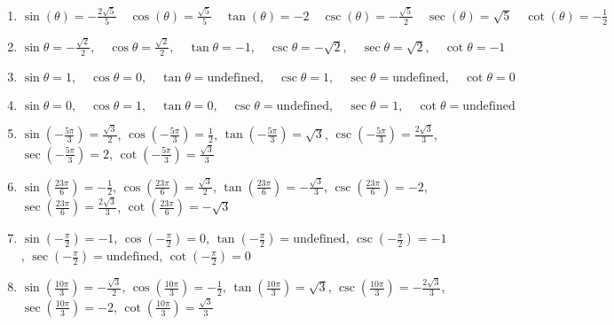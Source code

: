 \begin{enumerate}
    \item $\sin(\theta) = -\frac{2\sqrt{5}}{5} \quad  \cos(\theta) = \frac{\sqrt{5}}{5} \quad \tan(\theta) = -2 \quad \csc(\theta) = -\frac{\sqrt{5}}{2} \quad \sec(\theta) = \sqrt{5} \quad \cot(\theta) = -\frac{1}{2}$
     
    
    \item $\sin\theta = -\frac{\sqrt{2}}{2}, \quad \cos\theta = \frac{\sqrt{2}}{2}, \quad \tan\theta = -1, \quad \csc\theta = -\sqrt{2}, \quad \sec\theta = \sqrt{2}, \quad \cot\theta = -1$
    
    \item $\sin\theta = 1, \quad \cos\theta = 0, \quad \tan\theta = \text{undefined}, \quad \csc\theta = 1, \quad \sec\theta = \text{undefined}, \quad \cot\theta = 0$
    
    \item $\sin\theta = 0, \quad \cos\theta = 1, \quad \tan\theta = 0, \quad \csc\theta = \text{undefined}, \quad \sec\theta = 1, \quad \cot\theta = \text{undefined}$
    
    \item $\sin\left(-\frac{5\pi}{3}\right) = \frac{\sqrt{3}}{2}$, 
        $\cos\left(-\frac{5\pi}{3}\right) = \frac{1}{2}$, 
        $\tan\left(-\frac{5\pi}{3}\right) = \sqrt{3}$, 
        $\csc\left(-\frac{5\pi}{3}\right) = \frac{2\sqrt{3}}{3}$, 
        $\sec\left(-\frac{5\pi}{3}\right) = 2$, 
        $\cot\left(-\frac{5\pi}{3}\right) = \frac{\sqrt{3}}{3}$
        
    \item $\sin\left(\frac{23\pi}{6}\right) = -\frac{1}{2}$, 
        $\cos\left(\frac{23\pi}{6}\right) = \frac{\sqrt{3}}{2}$, 
        $\tan\left(\frac{23\pi}{6}\right) = -\frac{\sqrt{3}}{3}$, 
        $\csc\left(\frac{23\pi}{6}\right) = -2$, 
        $\sec\left(\frac{23\pi}{6}\right) = \frac{2\sqrt{3}}{3}$, 
        $\cot\left(\frac{23\pi}{6}\right) = -\sqrt{3}$
        
    \item $\sin\left(-\frac{\pi}{2}\right) = -1$, 
        $\cos\left(-\frac{\pi}{2}\right) = 0$, 
        $\tan\left(-\frac{\pi}{2}\right) = \text{undefined}$, 
        $\csc\left(-\frac{\pi}{2}\right) = -1$, 
        $\sec\left(-\frac{\pi}{2}\right) = \text{undefined}$, 
        $\cot\left(-\frac{\pi}{2}\right) = 0$
        
    \item $\sin\left(\frac{10\pi}{3}\right) = -\frac{\sqrt{3}}{2}$, 
        $\cos\left(\frac{10\pi}{3}\right) = -\frac{1}{2}$, 
        $\tan\left(\frac{10\pi}{3}\right) = \sqrt{3}$, 
        $\csc\left(\frac{10\pi}{3}\right) = -\frac{2\sqrt{3}}{3}$, 
        $\sec\left(\frac{10\pi}{3}\right) = -2$, 
        $\cot\left(\frac{10\pi}{3}\right) = \frac{\sqrt{3}}{3}$
        

\end{enumerate}
